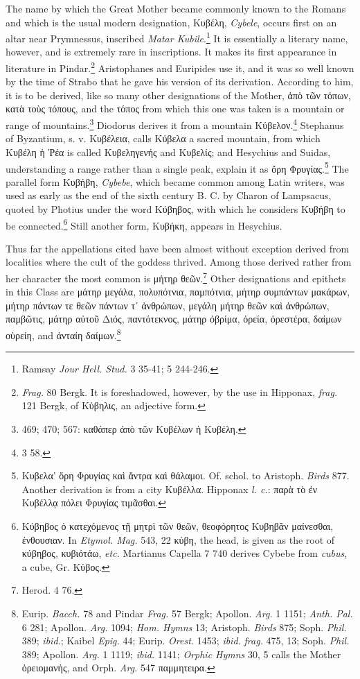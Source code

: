 \documentclass[a4paper, 11pt, oneside, polutonikogreek, english]{article}
\begin{document}
The name by which the Great Mother became commonly known to the Romans and which is the usual modern designation, Κυβέλη, \emph{Cybele}, occurs first on an altar near Prymnessus, inscribed \emph{Matar Kubile}.\footnote{Ramsay \emph{Jour Hell. Stud.} 3 35-41; 5 244-246.} It is essentially a literary name, however, and is extremely rare in inscriptions. It makes its first appearance in literature in Pindar.\footnote{\emph{Frag.} 80 Bergk. It is foreshadowed, however, by the use in Hipponax, \emph{frag.} 121 Bergk, of Κὑβηλις, an adjective form.} Aristophanes and Euripides use it, and it was so well known by the time of Strabo that he gave his version of its derivation. According to him, it is to be derived, like so many other designations of the Mother, ἀπὸ τῶν τόπων, κατὰ τοὺς τόπους, and the τόπος from which this one was taken is a mountain or range of mountains.\footnote{469; 470; 567: καθάπερ ἀπὸ τῶν Κυβέλων ἡ Κυβέλη.} Diodorus derives it from a mountain Κύβελον.\footnote{3 58.} Stephanus of Byzantium, s. v. Κυβέλεια, calls Κύβελα a sacred mountain, from which Κυβέλη ἡ Ῥέα is called Κυβεληγενής and Κυβελίς; and Hesychius and Suidas, understanding a range rather than a single peak, explain it as ὄρη Φρυγίας.\footnote{Κυβελα' ὄρη Φρυγίας καὶ ἄντρα καὶ θάλαμοι. Of. schol. to Aristoph. \emph{Birds} 877. Another derivation is from a city Κυβέλλα. Hipponax \emph{l. c.}: παρὰ τὸ ἐν Κυβέλλᾳ πόλει Φρυγίας τιμᾶσθαι.} The parallel form Κυβήβη, \emph{Cybebe}, which became common among Latin writers, was used as early as the end of the sixth century B. C. by Charon of Lampsacus, quoted by Photius under the word Κύβηβος, with which he considers Κυβήβη to be connected.\footnote{Κύβηβος ὁ κατεχόμενος τῇ μητρὶ τῶν θεῶν, θεοφόρητος Κυβηβᾶν μαίνεσθαι, ἐνθουσιαν. In \emph{Etymol. Mag.} 543, 22 κύβη, the head, is given as the root of κύβηβος, κυβιότάω, \emph{etc.} Martianus Capella 7 740 derives Cybebe from \emph{cubus}, a cube, Gr. Κύβος.} Still another form, Κυβήκη, appears in Hesychius.

Thus far the appellations cited have been almost without exception derived from localities where the cult of the goddess thrived. Among those derived rather from her character the most common is μήτηρ θεῶν.\footnote{Herod. 4 76.} Other designations and epithets in this Class are μάτηρ μεγάλα, πολυπότνια, παμπότνια, μήτηρ συμπάντων μακάρων, μήτηρ πάντων τε θεῶν πάντων τ᾽ ἀνθρώπων, μεγάλη μήτηρ θεῶν καὶ ἀνθρώπων, παμβῶτις, μάτηρ αὐτοῦ Διός, παντότεκνος, μάτηρ ὀβρίμα, ὀρεία, ὀρεστέρα, δαίμων οὐρείη, and ἀνταίη δαίμων.\footnote{Eurip. \emph{Bacch.} 78 and Pindar \emph{Frag.} 57 Bergk; Apollon. \emph{Arg.} 1 1151; \emph{Anth. Pal.} 6 281; Apollon. \emph{Arg.} 1094; \emph{Hom. Hymns} 13; Aristoph. \emph{Birds} 875; Soph. \emph{Phil.} 389; \emph{ibid.}; Kaibel \emph{Epig.} 44; Eurip. \emph{Orest.} 1453; \emph{ibid.} \emph{frag.} 475, 13; Soph. \emph{Phil.} 389; Apollon. \emph{Arg.} 1 1119; \emph{ibid.} 1141; \emph{Orphic Hymns} 30, 5 calls the Mother ὀρειομανής, and Orph. \emph{Arg.} 547 παμμητειρα.}
\end{document}
